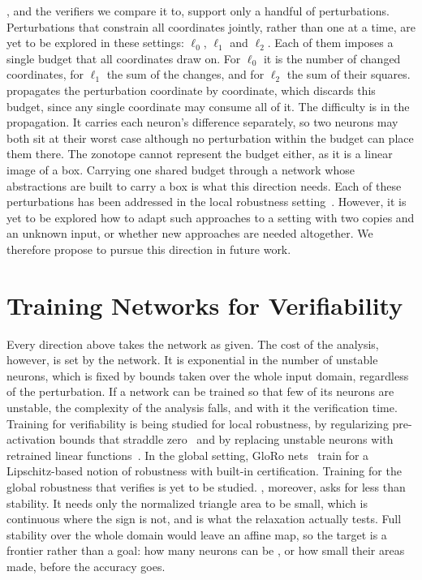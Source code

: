 \tool, and the verifiers we compare it to, support only a handful of
perturbations. Perturbations that constrain all coordinates jointly,
rather than one at a time, are yet to be explored in these settings:
$\ell_0$, $\ell_1$ and $\ell_2$. Each of them imposes a single budget
that all coordinates draw on. For $\ell_0$ it is the number of changed
coordinates, for $\ell_1$ the sum of the changes, and for $\ell_2$ the
sum of their squares. \tool propagates the perturbation coordinate by
coordinate, which discards this budget, since any single coordinate may
consume all of it. The difficulty is in the propagation. It carries each
neuron's difference separately, so two neurons may both sit at their
worst case although no perturbation within the budget can place them
there. The zonotope cannot represent the budget either, as it is a
linear image of a box. Carrying one shared budget through a network
whose abstractions are built to carry a box is what this direction
needs. Each of these perturbations has been addressed in the local
robustness setting~\citep{shapira2023calzone, croce2020lp,
cohen2019smoothing}. However, it is yet to be explored how to adapt such
approaches to a setting with two copies and an unknown input, or whether
new approaches are needed altogether. We therefore propose to pursue
this direction in future work.

\section{Training Networks for Verifiability}
\label{sec:future-training}

Every direction above takes the network as given. The cost of the
analysis, however, is set by the network. It is exponential in the
number of unstable neurons, which is fixed by bounds taken over the
whole input domain, regardless of the perturbation. If a network can be
trained so that few of its neurons are unstable, the complexity of the
analysis falls, and with it the verification time. Training for
verifiability is being studied for local robustness, by regularizing
pre-activation bounds that straddle zero~\citep{xiao2019relustability}
and by replacing unstable neurons with retrained linear
functions~\citep{chen2022grafting}. In the global setting, GloRo
nets~\citep{leino2021gloro} train for a Lipschitz-based notion of
robustness with built-in certification. Training for the global
robustness that \tool verifies is yet to be studied. \tool, moreover,
asks for less than stability. It needs only the normalized triangle area
to be small, which is continuous where the sign is not, and is what the
relaxation actually tests. Full stability over the whole domain would
leave an affine map, so the target is a frontier rather than a goal: how
many neurons can be , or how small their areas made, before the
accuracy goes.


